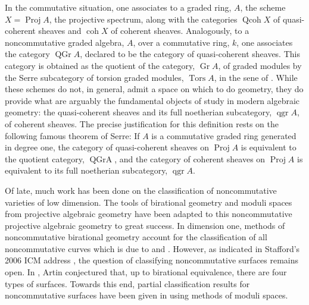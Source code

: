 \documentclass[11pt]{amsart}
\begin{document}
In the commutative situation, one associates to a graded ring, $A$, the scheme $X = \operatorname{Proj} A$, the projective spectrum, along with the categories $\operatorname{Qcoh} X$ of quasi-coherent sheaves and $\operatorname{coh} X$ of coherent sheaves.
Analogously, to a noncommutative graded algebra, $A$, over a commutative ring, $k$, one associates the category $\operatorname{QGr} A$, declared to be the category of quasi-coherent sheaves.
This category is obtained as the quotient of the category, $\operatorname{Gr} A$, of graded modules by the Serre subcategory of torsion graded modules, $\operatorname{Tors} A$, in the sene of \cite{DCA}.
While these schemes do not, in general, admit a space on which to do geometry, they do provide what are arguably the fundamental objects of study in modern algebraic geometry: the quasi-coherent sheaves and its full noetherian subcategory, $\operatorname{qgr} A$, of coherent sheaves.
The  precise justification for this definition rests on the following famous theorem of Serre: If $A$ is a commutative graded ring generated in degree one, the category of quasi-coherent sheaves on $\operatorname{Proj} A$ is equivalent to the quotient category, $\operatorname{QGr A}$, and the category of coherent sheaves on $\operatorname{Proj} A$ is equivalent to its full noetherian subcategory, $\operatorname{qgr} A$.

Of late, much work has been done on the classification of noncommutative varieties of low dimension.
The tools of birational geometry and moduli spaces from projective algebraic geometry have been adapted to this noncommutative projective algebraic geometry to great success.
In dimension one, methods of noncommutative birational geometry account for the classification of all noncommutative curves which is due to \cite{AS95} and \cite{Reiten-VdB}.
However, as indicated in Stafford's 2006 ICM address \cite{Stafford02}, the question of classifying noncommutative surfaces remains open.
In \cite{ArtinConj}, Artin conjectured that, up to birational equivalence, there are four types of surfaces.
Towards this end, partial classification results for noncommutative surfaces have been given in \cite{ATV,Stephenson96,Stephenson97} using methods of moduli spaces.
\end{document}
